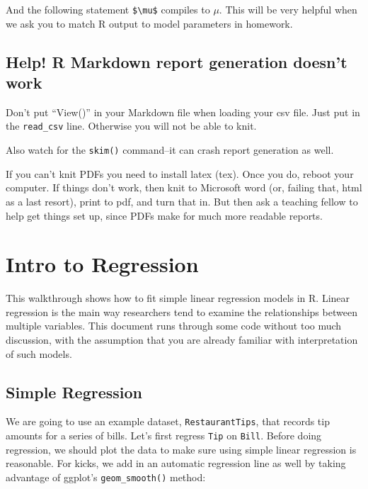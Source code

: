 \documentclass[
  letterpaper,
  DIV=11,
  numbers=noendperiod]{scrreprt}
\begin{document}
And the following statement \texttt{\$\textbackslash{}mu\$} compiles to
\(\mu\). This will be very helpful when we ask you to match R output to
model parameters in homework.

\hypertarget{help-r-markdown-report-generation-doesnt-work}{%
\section{Help! R Markdown report generation doesn't
work}\label{help-r-markdown-report-generation-doesnt-work}}

Don't put ``View()'' in your Markdown file when loading your csv file.
Just put in the \texttt{read\_csv} line. Otherwise you will not be able
to knit.

Also watch for the \texttt{skim()} command--it can crash report
generation as well.

If you can't knit PDFs you need to install latex (tex). Once you do,
reboot your computer. If things don't work, then knit to Microsoft word
(or, failing that, html as a last resort), print to pdf, and turn that
in. But then ask a teaching fellow to help get things set up, since PDFs
make for much more readable reports.

\hypertarget{section}{%
\subsection{}\label{section}}

\hypertarget{intro-to-regression}{%
\chapter{Intro to Regression}\label{intro-to-regression}}

This walkthrough shows how to fit simple linear regression models in R.
Linear regression is the main way researchers tend to examine the
relationships between multiple variables. This document runs through
some code without too much discussion, with the assumption that you are
already familiar with interpretation of such models.

\hypertarget{simple-regression}{%
\section{Simple Regression}\label{simple-regression}}

We are going to use an example dataset, \texttt{RestaurantTips}, that
records tip amounts for a series of bills. Let's first regress
\texttt{Tip} on \texttt{Bill}. Before doing regression, we should plot
the data to make sure using simple linear regression is reasonable. For
kicks, we add in an automatic regression line as well by taking
advantage of ggplot's \texttt{geom\_smooth()} method:
\end{document}

